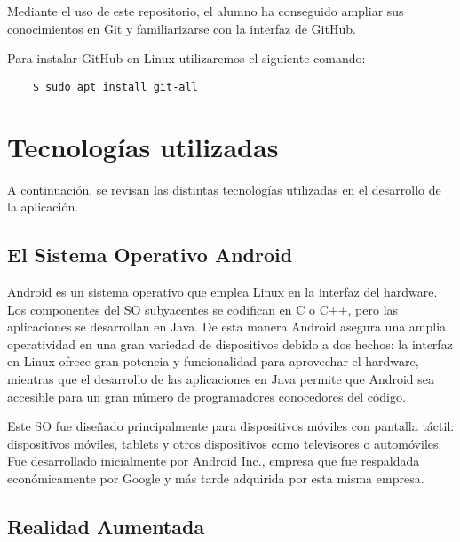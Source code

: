 Mediante el uso de este repositorio, el alumno ha conseguido ampliar sus conocimientos en Git y familiarizarse con la interfaz de GitHub.

Para instalar GitHub en Linux utilizaremos el siguiente comando:
\begin{lstlisting}
    $ sudo apt install git-all
\end{lstlisting}

\section{Tecnologías utilizadas}

A continuación, se revisan las distintas tecnologías utilizadas en el desarrollo de la aplicación.

\subsection{El Sistema Operativo Android}

Android es un sistema operativo que emplea Linux en la interfaz del hardware.  Los componentes del SO subyacentes se codifican en C o C++, pero las aplicaciones se desarrollan en Java. De esta manera Android asegura una amplia operatividad en una gran variedad de dispositivos debido a dos hechos: la interfaz en Linux ofrece gran potencia y funcionalidad para aprovechar el hardware, mientras que el desarrollo de las aplicaciones en Java permite que Android sea accesible para un gran número de programadores conocedores del código.

Este SO fue diseñado principalmente para dispositivos móviles con pantalla táctil: dispositivos móviles, tablets y otros dispositivos como televisores o automóviles. Fue desarrollado inicialmente por Android Inc., empresa que fue respaldada económicamente por Google y más tarde adquirida por esta misma empresa.


\subsection{Realidad Aumentada}

